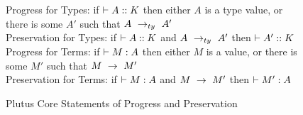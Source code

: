 \documentclass[../main.tex]{subfiles}
\begin{document}
\begin{figure*}
    Progress for Types: if \(\vdash A :: K\) then either $A$ is a type value, or there is some $A'$ such that $A ~ \rightarrow_{ty} ~ A'$\\
    
    Preservation for Types: if \(\vdash A :: K\) and \(A ~ \rightarrow_{ty} ~ A'\) then \(\vdash A' :: K\)\\
    
    Progress for Terms: if \(\vdash M : A\) then either $M$ is a value, or there is some $M'$ such that $M ~ \rightarrow ~ M'$\\
    
    Preservation for Terms: if \(\vdash M : A\) and \(M ~ \rightarrow ~ M'\) then \(\vdash M' : A\)\\

    \caption{Plutus Core Statements of Progress and Preservation}
    \label{fig:Plutus_core_statements_pnp}
\end{figure*}
\end{document}
